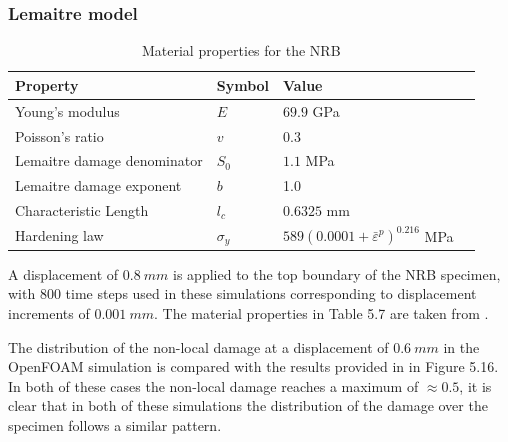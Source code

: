 \documentclass[sn-mathphys,Numbered,draft]{sn-jnl}%
\begin{document}
\subsubsection{Lemaitre model}

\begin{table}[htb]
	\centering
		\begin{tabular}{llll} \hline
			Property & Symbol & Value  \\ \hline 
			Young's modulus & $E$ & $69.9$ GPa \\
			Poisson's ratio & $v$ & $0.3$   \\
			Lemaitre damage denominator & $S_0$ & $1.1$ MPa  \\
			Lemaitre damage exponent & $b$ & 1.0  \\
			Characteristic Length & $l_c$ & $0.6325$ mm  \\
			Hardening law & $\sigma_y$ & $589({0.0001+\bar{\varepsilon}}^p)^{0.216}$ MPa \\
			\hline
		\end{tabular}
	\caption{Material properties for the NRB}
	\label{tab:material_properties}
\end{table}

A displacement of $0.8\ mm$ is applied to the top boundary of the NRB specimen, with 800 time steps used in these simulations corresponding to displacement increments of $0.001\ mm$. The material properties in Table 5.7 are taken from \citet{cesar_de_sa_damage_2006}.

The distribution of the non-local damage at a displacement of $0.6\ mm$ in the OpenFOAM simulation is compared with the results provided in \citet{cesar_de_sa_damage_2006} in Figure 5.16. In both of these cases the non-local damage reaches a maximum of $\approx0.5$, it is clear that in both of these simulations the distribution of the damage over the specimen follows a similar pattern.
\end{document}
